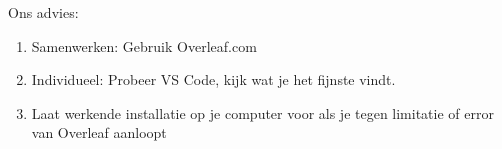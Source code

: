 \begin{frame}[fragile]
\begin{columns}
\begin{column}{0.4\textwidth}
{            \bigskip
            
            Ons advies:
            \begin{enumerate}[label={\arabic*)}]
                \item Samenwerken: Gebruik Overleaf.com
                \item Individueel: Probeer VS Code, kijk wat je het fijnste vindt.
                \item Laat werkende installatie op je computer voor als je tegen
                limitatie of error van Overleaf aanloopt
            \end{enumerate}
            }
        \end{column}
    \end{columns}

    \relax
    


\end{frame}


